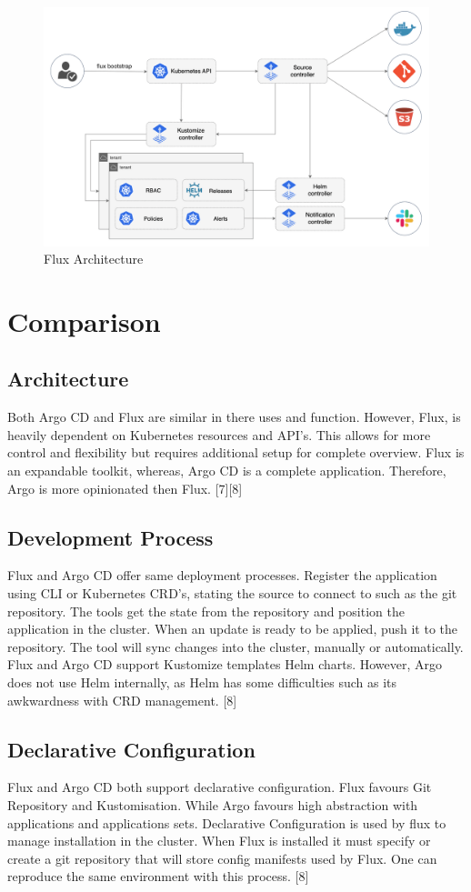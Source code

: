 \documentclass[conference]{IEEEtran}
\begin{document}
\begin{figure}[htbp]
    \centering
    \includegraphics[width=0.7\linewidth]{Flux Architecture.png}
    \caption{Flux Architecture}
    \label{fig:flux-arch}
\end{figure}

\section{Comparison}

\subsection{Architecture}
Both Argo CD and Flux are similar in there uses and function. However, Flux, is heavily dependent on Kubernetes resources and API's. This allows for more control and flexibility but requires additional setup for complete overview. Flux is an expandable toolkit, whereas, Argo CD is a complete application. Therefore, Argo is more opinionated then Flux. [7][8]  

\subsection{Development Process}
Flux and Argo CD offer same deployment processes. Register the application using CLI or Kubernetes CRD's, stating the source to connect to such as the git repository. The tools get the state from the repository and position the application in the cluster. When an update is ready to be applied, push it to the repository. The tool will sync changes into the cluster, manually or automatically. Flux and Argo CD support Kustomize templates Helm charts. However, Argo does not use Helm internally, as Helm has some difficulties such as its awkwardness with CRD management. [8]

\subsection{Declarative Configuration}
Flux and Argo CD both support declarative configuration. Flux favours Git Repository and Kustomisation. While Argo favours high abstraction with applications and applications sets. Declarative Configuration is used by flux to manage installation in the cluster. When Flux is installed it must specify or create  a git repository that will store config manifests used by Flux. One can reproduce the same environment with this process. [8]
\end{document}
